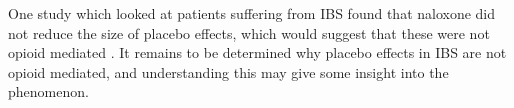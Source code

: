 One study which looked at patients suffering from IBS found that naloxone did not reduce the size of placebo effects, which would suggest that these were not opioid mediated \cite{Vase2005}. It remains to be determined why placebo effects in IBS are not opioid mediated, and understanding this may give some insight into the phenomenon. 






